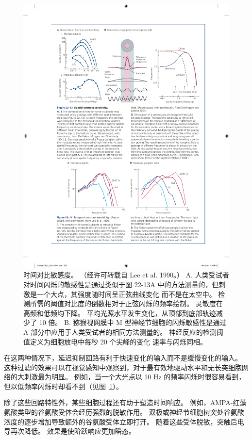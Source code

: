 \begin{figure}[htbp]
	\centering
	\includegraphics[width=1.0\linewidth]{chap22/fig_22_14}
	\caption{时间对比敏感度。 （经许可转载自 Lee et al. 1990。）
		A. 人类受试者对时间闪烁的敏感性是通过类似于图 22-13A 中的方法测量的，但刺激是一个大点，其强度随时间呈正弦曲线变化 而不是在太空中。 
		检测所需的阈值对比度的倒数相对于正弦闪烁的频率绘制。 
		灵敏度在高频和低频均下降。 
		平均光照水平发生变化，从顶部到底部轨迹减少了 10 倍。 
		B. 猕猴视网膜中 M 型神经节细胞的闪烁敏感性是通过 A 部分中应用于人类受试者的相同方法测量的。
		神经反应的检测阈值定义为细胞放电中每秒 20 个尖峰的变化 速率与闪烁同相。}
	\label{fig:22_14}
\end{figure}


在这两种情况下，延迟抑制回路有利于快速变化的输入而不是缓慢变化的输入。
这种过滤的效果可以在视觉感知中观察到，对于最有效地驱动水平和无长突细胞网络的大刺激最为明显。
例如，当一个大光点以 10 Hz 的频率闪烁时很容易看到，但以低频率闪烁时却看不到（见图~\ref{fig:22_14}）。


除了这些回路特性外，某些细胞过程还有助于塑造时间响应。
例如，AMPA-红藻氨酸类型的谷氨酸受体会经历强烈的脱敏作用。
双极或神经节细胞树突处谷氨酸浓度的逐步增加导致额外的谷氨酸受体立即打开。
随着这些受体脱敏，突触后电导再次降低。
效果是使阶跃响应更加瞬态。


